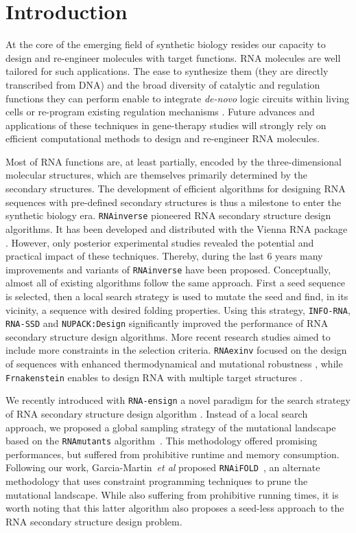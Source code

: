 \documentclass{bioinfo}
\newcommand{\RNAmutants}{\texttt{RNAmutants}\xspace}
\newcommand{\RNAinverse}{\texttt{RNAinverse}\xspace}
\newcommand{\RNASSD}{\texttt{RNA-SSD}\xspace}
\newcommand{\INFORNA}{\texttt{INFO-RNA}\xspace}
\newcommand{\NUPACK}{\texttt{NUPACK:Design}\xspace}
\newcommand{\RNAiFOLD}{\texttt{RNAiFOLD}\xspace}
\newcommand{\frankenstein}{\texttt{Frnakenstein}\xspace}
\newcommand{\RNAexinv}{\texttt{RNAexinv}\xspace}
\newcommand{\RNAensign}{\texttt{RNA-ensign}\xspace}
\begin{document}
\section{Introduction}
\label{sec:introduction}

At the core of the emerging field of synthetic biology resides our capacity to design and re-engineer molecules with target functions. RNA molecules are well tailored for such applications. The ease to synthesize them (they are directly transcribed from DNA) and the broad diversity of catalytic and regulation functions they can perform enable to integrate \textit{de-novo} logic  circuits within living cells \citep{Rodrigo:2012fk} or re-program existing regulation mechanisms \citep{Chang:2012uq}. Future advances and applications of these techniques in gene-therapy studies will strongly rely on efficient computational methods to design and re-engineer RNA molecules.

Most of RNA functions are, at least partially, encoded by the three-dimensional molecular structures, which are themselves primarily determined by the secondary structures. The development of efficient algorithms for designing RNA sequences with pre-defined secondary structures is thus a milestone to enter the synthetic biology era. \RNAinverse pioneered RNA secondary structure design algorithms. It has been developed and distributed with the Vienna RNA package \citep{Hofacker:1994}. However, only posterior experimental studies revealed the potential and practical impact of these techniques. Thereby, during the last 6 years many improvements and variants of \RNAinverse have been proposed. Conceptually, almost all of existing algorithms follow the same approach. First a seed sequence is selected, then a local search strategy is used to mutate the seed and find, in its vicinity, a sequence with desired folding properties. Using this strategy, \INFORNA \citep{Busch:2006uq}, \RNASSD \citep{Aguirre-Hernandez:2007kx} and \NUPACK \citep{Zadeh:2011fk} significantly improved the performance of RNA secondary structure design algorithms. More recent research studies aimed to include more constraints in the selection criteria. \RNAexinv focused on the design of sequences with enhanced thermodynamical and mutational robustness \citep{Avihoo:2011fk}, while \frankenstein enables to design RNA with multiple target structures \citep{Lyngso:2012vn}.

We recently introduced with \RNAensign a novel paradigm for the search strategy of RNA secondary structure design algorithm \citep{Levin:2012kx}. Instead of a local search approach, we proposed a global sampling strategy of the mutational landscape based on the \RNAmutants algorithm~\citep{Waldispuhl2008}. This methodology offered promising performances, but suffered from  prohibitive runtime and memory consumption. Following our work, Garcia-Martin~\emph{et al} proposed \RNAiFOLD~\citep{Garcia-Martin:2013aa}, an alternate methodology that uses constraint programming techniques to prune the mutational landscape. While also suffering from prohibitive running times, it is worth noting that this latter algorithm also proposes a seed-less approach to the RNA secondary structure design problem.
\end{document}
